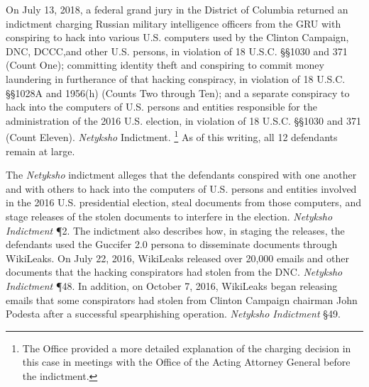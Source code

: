 On July 13, 2018, a federal grand jury in the District of Columbia returned an indictment charging Russian military intelligence officers from the GRU with conspiring to hack into various U.S. computers used by the Clinton Campaign, DNC, DCCC,and other U.S. persons, in violation of 18 U.S.C. \S\S 1030 and 371 (Count One); committing identity theft and conspiring to commit money laundering in furtherance of that hacking conspiracy, in violation of 18 U.S.C. \S\S 1028A and 1956(h) (Counts Two through Ten); and a separate conspiracy to hack into the computers of U.S. persons and entities responsible for the administration of the 2016 U.S. election, in violation of 18 U.S.C. \S\S 1030 and 371 (Count Eleven).
\textit{Netyksho} Indictment.%
\footnote{The Office provided a more detailed explanation of the charging decision in this case in meetings with the Office of the Acting Attorney General before the indictment.}
As of this writing, all 12 defendants remain at large.

The \textit{Netyksho} indictment alleges that the defendants conspired with one another and with others to hack into the computers of U.S. persons and entities involved in the 2016 U.S. presidential election, steal documents from those computers, and stage releases of the stolen documents to interfere in the election.
\textit{Netyksho Indictment} \P 2.
The indictment also describes how, in staging the releases, the defendants used the Guccifer 2.0 persona to disseminate documents through WikiLeaks.
On July 22, 2016, WikiLeaks released over 20,000 emails and other documents that the hacking conspirators had stolen from the DNC.
\textit{Netyksho Indictment} \P 48.
In addition, on October 7, 2016, WikiLeaks began releasing emails that some conspirators had stolen from Clinton Campaign chairman John Podesta after a successful spearphishing operation.
\textit{Netyksho Indictment} \S 49.




